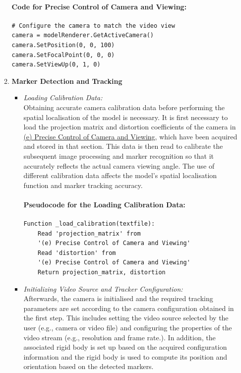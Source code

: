 \documentclass[12pt]{article}
\begin{document}
\begin{enumerate}
\begin{enumerate}
                        \paragraph{Code for Precise Control of Camera and Viewing:}
                        \begin{verbatim}
# Configure the camera to match the video view
camera = modelRenderer.GetActiveCamera()
camera.SetPosition(0, 0, 100)
camera.SetFocalPoint(0, 0, 0)
camera.SetViewUp(0, 1, 0)
                        \end{verbatim}
                  \item \textbf{Marker Detection and Tracking}
                        \begin{itemize}
                              \item \textit{Loading Calibration Data:}
                                    \\
                                    Obtaining accurate camera calibration data before performing the spatial localisation of the model is necessary. It is first necessary to load the projection matrix and distortion coefficients of the camera in \hyperref[sec:precise]{(e) Precise Control of Camera and Viewing}, which have been acquired and stored in that section. This data is then read to calibrate the subsequent image processing and marker recognition so that it accurately reflects the actual camera viewing angle. The use of different calibration data affects the model's spatial localisation function and marker tracking accuracy.
                                    \paragraph{Pseudocode for the Loading Calibration Data:}
                                    \begin{verbatim}
Function _load_calibration(textfile):
    Read 'projection_matrix' from  
    '(e) Precise Control of Camera and Viewing'
    Read 'distortion' from 
    '(e) Precise Control of Camera and Viewing'
    Return projection_matrix, distortion
                              \end{verbatim}
                              \item \textit{Initializing Video Source and Tracker Configuration:}
                                    \\
                                    Afterwards, the camera is initialised and the required tracking parameters are set according to the camera configuration obtained in the first step. This includes setting the video source selected by the user (e.g., camera or video file) and configuring the properties of the video stream (e.g., resolution and frame rate.). In addition, the associated rigid body is set up based on the acquired configuration information and the rigid body is used to compute its position and orientation based on the detected markers.

\end{itemize}
\end{enumerate}
\end{enumerate}
\end{document}
